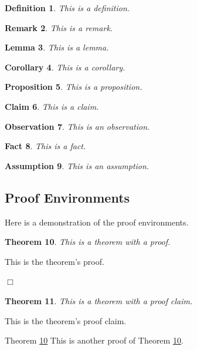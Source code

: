 \documentclass{article}
\newtheorem{theorem}{Theorem}
\newtheorem{definition}[theorem]{Definition}
\newtheorem{remark}[theorem]{Remark}
\newtheorem{lemma}[theorem]{Lemma}
\newtheorem{corollary}[theorem]{Corollary}
\newtheorem{proposition}[theorem]{Proposition}
\newtheorem{claim}[theorem]{Claim}
\newtheorem{observation}[theorem]{Observation}
\newtheorem{fact}[theorem]{Fact}
\newtheorem{assumption}[theorem]{Assumption}
\newenvironment{proof}{\noindent{\bf Proof:} \hspace*{1mm}}{
	\hspace*{\fill} $\Box$ }
\newenvironment{proof_of}[1]{\noindent {\bf Proof of #1:}
	\hspace*{1mm}}{\hspace*{\fill} $\Box$ }
\newenvironment{proof_claim}{\begin{quotation} \noindent}{
	\hspace*{\fill} $\diamond$ \end{quotation}}
\begin{document}
\begin{definition}
This is a definition.
\end{definition}

\begin{remark}
This is a remark.
\end{remark}

\begin{lemma}
This is a lemma.
\end{lemma}

\begin{corollary}
This is a corollary.
\end{corollary}

\begin{proposition}
This is a proposition.
\end{proposition}

\begin{claim}
This is a claim.
\end{claim}

\begin{observation}
This is an observation.
\end{observation}

\begin{fact}
This is a fact.
\end{fact}

\begin{assumption}
This is an assumption.
\end{assumption}

\subsection{Proof Environments}

Here is a demonstration of the proof environments.

\begin{theorem}
\label{thm:thm1}
This is a theorem with a proof.
\end{theorem}

\begin{proof}
This is the theorem's proof.
\end{proof}

\begin{theorem}
This is a theorem with a proof claim.
\end{theorem}

\begin{proof_claim}
This is the theorem's proof claim.
\end{proof_claim}

\begin{proof_of}{Theorem \ref{thm:thm1}}
This is another proof of Theorem \ref{thm:thm1}.
\end{proof_of}




\end{document}
